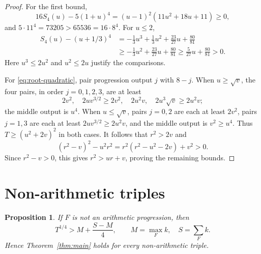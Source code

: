 \documentclass[11pt,a4paper]{article}
\newtheorem{proposition}[theorem]{Proposition}
\theoremstyle{remark}
\begin{document}
\begin{proof}
For the first bound,
\[
 16S_4(u)-5(1+u)^4=(u-1)^2(11u^2+18u+11)\ge0,
\]
and $5\cdot11^4=73205>65536=16\cdot8^4$.
For $u\le2$,
\begin{align*}
 S_4(u)-(u+1/3)^4
 &=-\tfrac13u^3+\tfrac13u^2+\tfrac{23}{27}u+\tfrac{80}{81}\\
 &\ge-\tfrac13u^2+\tfrac{23}{27}u+\tfrac{80}{81}
 \ge\tfrac5{27}u+\tfrac{80}{81}>0.
\end{align*}
Here $u^3\le2u^2$ and $u^2\le2u$ justify the comparisons.

For \eqref{eq:root-quadratic}, pair progression output $j$ with $8-j$.
When $u\ge\sqrt v$, the four pairs, in order $j=0,1,2,3$, are at least
\[
 2v^2,\quad2uv^{3/2}\ge2v^2,\quad
 2u^2v,\quad2u^3\sqrt v\ge2u^2v;
\]
the middle output is $u^4$. When $u\le\sqrt v$, pairs $j=0,2$ are
each at least $2v^2$, pairs $j=1,3$ are each at least
$2uv^{3/2}\ge2u^2v$, and the middle output is $v^2\ge u^4$.
Thus $T\ge(u^2+2v)^2$ in both cases. It follows that $r^2>2v$ and
\[
 (r^2-v)^2-u^2r^2=r^2(r^2-u^2-2v)+v^2>0.
\]
Since $r^2-v>0$, this gives $r^2>ur+v$, proving the remaining bounds.
\end{proof}

\section{Non-arithmetic triples}\label{sec:nonap}

\begin{proposition}\label{prop:nonap}
If $F$ is not an arithmetic progression, then
\[
 T^{1/4}>M+\frac{S-M}{4},\qquad
 M=\max_F k,\quad S=\sum_F k.
\]
Hence Theorem~\ref{thm:main} holds for every non-arithmetic triple.
\end{proposition}
\end{document}
